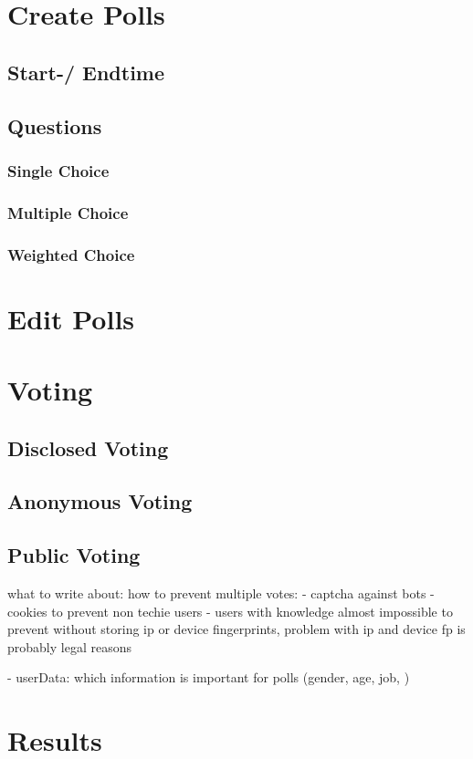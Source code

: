 \documentclass[a4paper,12pt]{report}
\begin{document}
\section{Create Polls}
\subsection{Start-/ Endtime}
\subsection{Questions}
\subsubsection{Single Choice}
\subsubsection{Multiple Choice}
\subsubsection{Weighted Choice}
\section{Edit Polls}
\section{Voting}
\subsection{Disclosed Voting}
\subsection{Anonymous Voting}
\subsection{Public Voting}
what to write about:
how to prevent multiple votes: 
- 	captcha against bots 
-	cookies to prevent non techie users 
-	users with knowledge almost impossible to prevent without storing ip or device fingerprints, 
	problem with ip and device fp is probably legal reasons
	
-	userData: which information is important for polls (gender, age, job, )
\section{Results}
\end{document}
